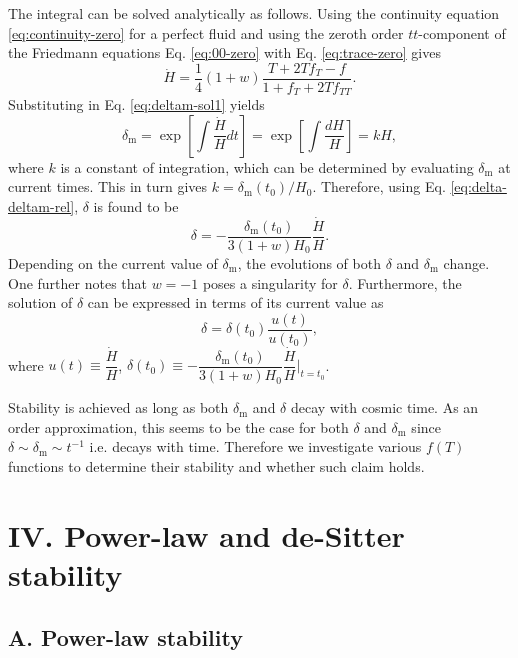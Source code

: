 \documentclass[prl,floatfix,showpacs,twocolumn,preprintnumbers,amsmath,amssymb,superscriptaddress]{revtex4}
\begin{document}
The integral can be solved analytically as follows. Using the continuity equation \eqref{eq:continuity-zero} for a perfect fluid and using the zeroth order $tt$-component of the Friedmann equations Eq. \eqref{eq:00-zero} with Eq. \eqref{eq:trace-zero} gives
\begin{equation}
\dot{H} = \dfrac{1}{4}(1+w) \dfrac{T+2T f_T -f}{1 + f_T + 2T f_{TT}}.
\end{equation}
Substituting in Eq. \eqref{eq:deltam-sol1} yields
\begin{equation}\label{eq:deltam-solution}
\delta_{\text{m}} = \exp\left[\int \dfrac{\dot{H}}{H} dt\right] = \exp\left[\int \dfrac{dH}{H}\right] = kH,
\end{equation}
where $k$ is a constant of integration, which can be determined by evaluating $\delta_{\text{m}}$ at current times. This in turn gives $k = \delta_{\text{m}}\left(t_0\right)/H_0$. Therefore, using Eq. \eqref{eq:delta-deltam-rel}, $\delta$ is found to be
\begin{equation}
\delta = -\dfrac{\delta_{\text{m}}\left(t_0\right)}{3(1+w)H_0} \dfrac{\dot{H}}{H}.
\end{equation}
Depending on the current value of $\delta_{\text{m}}$, the evolutions of both $\delta$ and $\delta_{\text{m}}$ change. One further notes that $w = -1$ poses a singularity for $\delta$. Furthermore, the solution of $\delta$ can be expressed in terms of its current value as
\begin{equation}\label{eq:delta-solution}
\delta = \delta\left(t_0\right) \dfrac{u(t)}{u(t_0)},
\end{equation}
where $u(t) \equiv \dfrac{\dot{H}}{H}$, $\delta\left(t_0\right) \equiv -\dfrac{\delta_{\text{m}}\left(t_0\right)}{3(1+w)H_0}  \dfrac{\dot{H}}{H}\bigg|_{t = t_0}$.

Stability is achieved as long as both $\delta_{\text{m}}$ and $\delta$ decay with cosmic time. As an order approximation, this seems to be the case for both $\delta$ and $\delta_{\text{m}}$ since $\delta \sim \delta_{\text{m}} \sim t^{-1}$ i.e. decays with time. Therefore we investigate various $f(T)$ functions to determine their stability and whether such claim holds.

\section{IV. Power-law and de-Sitter stability}

\subsection{A. Power-law stability}
\end{document}
